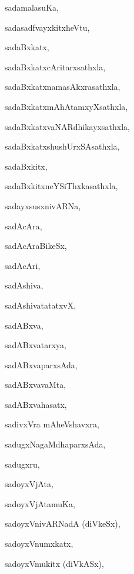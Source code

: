 \begin{multicols}{2}
{sadamalasuKa}, \pageref{sadamalasuKa}

{sadasadfvayxkitxheVtu}, \pageref{sadasadfvayxkitxheVtu}

{sadaBxkatx}, \pageref{sadaBxkatx}

{sadaBxkatxcAritarxsathxla}, \pageref{sadaBxkatxcAritarxsathxla}

{sadaBxkatxnamasAkxrasathxla}, \pageref{sadaBxkatxnamasAkxrasathxla}

{sadaBxkatxmAhAtamxyXsathxla}, \pageref{sadaBxkatxmAhAtamxyXsathxla}

{sadaBxkatxvaNARdhikayxsathxla}, \pageref{sadaBxkatxvaNARdhikayxsathxla}

{sadaBxkatxshushUrxSAsathxla}, \pageref{sadaBxkatxshushUrxSAsathxla}

{sadaBxkitx}, \pageref{sadaBxkitx}

{sadaBxkitxneYSiThxkasathxla}, \pageref{sadaBxkitxneYSiThxkasathxla}

{sadayxsusxnivARNa}, \pageref{sadayxsusxnivARNa}

{sadAcAra}, \pageref{sadAcAra}

{sadAcAraBikeSx}, \pageref{sadAcAraBikeSx}

{sadAcAri}, \pageref{sadAcAri}

{sadAshiva}, \pageref{sadAshiva}

{sadAshivatatatxvX}, \pageref{sadAshivatatatxvX}

{sadABxva}, \pageref{sadABxva}

{sadABxvatarxya}, \pageref{sadABxvatarxya}

{sadABxvaparxsAda}, \pageref{sadABxvaparxsAda}

{sadABxvavaMta}, \pageref{sadABxvavaMta}

{sadABxvahasatx}, \pageref{sadABxvahasatx}

{sadivxVra mAheVshavxra}, \pageref{sadivxVramAheVshavxra}

{sadugxNagaMdhaparxsAda}, \pageref{sadugxNagaMdhaparxsAda}

{sadugxru}, \pageref{sadugxru}

{sadoyxVjAta}, \pageref{sadoyxVjAta}

{sadoyxVjAtamuKa}, \pageref{sadoyxVjAtamuKa}

{sadoyxVnivARNadA (diVkeSx)}, \pageref{sadoyxVnivARNadAdiVkeSx}

{sadoyxVnumxkatx}, \pageref{sadoyxVnumxkatx}

{sadoyxVmukitx (diVkASx)}, \pageref{sadoyxVmukitxdiVkASx}


\end{multicols}
